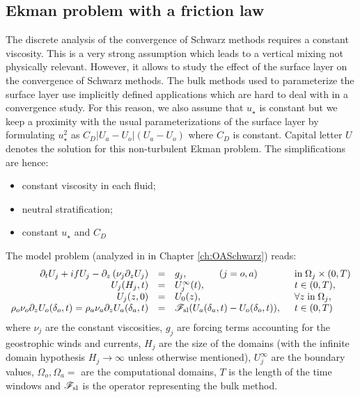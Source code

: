 \subsection{Ekman problem with a friction law}
\label{sec:airseaSCM_hierarchy_Ekman}
The discrete analysis of the convergence of Schwarz methods
requires a constant viscosity. This is a very strong assumption
which leads to a vertical mixing not physically relevant.
However, it allows to study the effect of the surface layer on the
convergence of Schwarz methods.
The bulk methods used to parameterize the surface layer use
implicitly defined applications which are hard to deal with
in a convergence study. For this reason, we also assume
that $u_\star$ is constant but we keep a proximity with
the usual parameterizations of the surface layer
by formulating $u_\star^2$
as $C_D |U_a - U_o|(U_a-U_o)$ where $C_D$ is constant.
Capital letter $U$ denotes the solution for this non-turbulent
Ekman problem.
The simplifications are hence:
\begin{itemize}
	\item constant viscosity in each fluid;
	\item neutral stratification;
	\item constant $u_\star$ and $C_D$
\end{itemize}
The model problem (analyzed in in Chapter \ref{ch:OASchwarz}) reads:
\begin{equation}
\label{eq:cplProblem}
\begin{array}{rcll}
\partial_t U_j + i f U_j -
	\partial_z \left( \nu_j \partial_z U_j \right) &=& g_j,
~~~~~~~~~~ (j=o,a)
& \mbox{in}\;\Omega_j \times (0,T)\\
U_j(H_j,t) &=& U_j^\infty(t),  & t \in (0,T), \\ 
U_j(z,0) &=& U_0(z), & \forall z \; \mbox{in}\; \Omega_j, \\
\rho_o \nu_o \partial_z U_o(\delta_o,t) = \rho_a \nu_a \partial_z U_a(\delta_a,t)
&=& {\cal F}_{\rm sl}( U_a(\delta_a,t)-U_o(\delta_o,t) ), \;\; & t \in (0,T)
\end{array}
\end{equation}
where $\nu_j$ are the constant viscosities, $g_j$ are forcing terms
accounting for the geostrophic winds and currents,
$H_j$ are the size of the domains (with the infinite
domain hypothesis $H_j \rightarrow \infty$
unless otherwise mentioned), $U_j^\infty$ are the boundary
values, $\Omega_o, \Omega_a =$ are the computational domains,
$T$ is the length of the time windows and 
${\cal F}_{\rm sl}$ is the operator representing the bulk
method.
